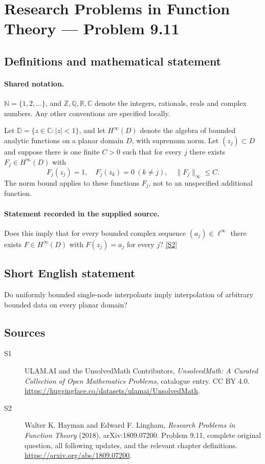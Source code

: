 \documentclass[11pt]{book}
\newcommand{\sref}[2]{\hyperlink{source:#1:#2}{[S#2]}}
\begin{document}
\section{Research Problems in Function Theory — Problem 9.11}\label{statement}

\subsection{Definitions and mathematical statement}

\paragraph{Shared notation.}$\mathbb N=\{1,2,\ldots\}$, and $\mathbb Z,\mathbb Q,\mathbb R,\mathbb C$ denote the integers, rationals, reals and complex numbers. Any other conventions are specified locally.


Let $\mathbb D=\{z\in\mathbb C:|z|<1\}$, and let $H^{\infty}(D)$ denote the algebra of bounded analytic functions on a planar domain $D$, with supremum norm. Let $(z_j)\subset D$ and suppose there is one finite $C>0$ such that for every $j$ there exists $F_j\in H^{\infty}(D)$ with \[F_j(z_j)=1,\quad F_j(z_k)=0\ (k\ne j),\quad\|F_j\|_\infty\le C.\] The norm bound applies to these functions $F_j$, not to an unspecified additional function.
\paragraph{Statement recorded in the supplied source.}
Does this imply that for every bounded complex sequence $(a_j)\in\ell^{\infty}$ there exists $F\in H^{\infty}(D)$ with $F(z_j)=a_j$ for every $j$? \sref{statement}{2}
\subsection{Short English statement}
Do uniformly bounded single-node interpolants imply interpolation of arbitrary bounded data on every planar domain?
\subsection{Sources}
\begin{description}
\item[\hypertarget{source:statement:1}{S1}] ULAM.AI and the UnsolvedMath Contributors, \emph{UnsolvedMath: A Curated Collection of Open Mathematics Problems}, catalogue entry. CC BY 4.0. \url{https://huggingface.co/datasets/ulamai/UnsolvedMath}.
\item[\hypertarget{source:statement:2}{S2}] Walter K. Hayman and Edward F. Lingham, \emph{Research Problems in Function Theory} (2018), arXiv:1809.07200. Problem 9.11, complete original question, all following updates, and the relevant chapter definitions. \url{https://arxiv.org/abs/1809.07200}.
\end{description}
\label{end:statement}
\end{document}
